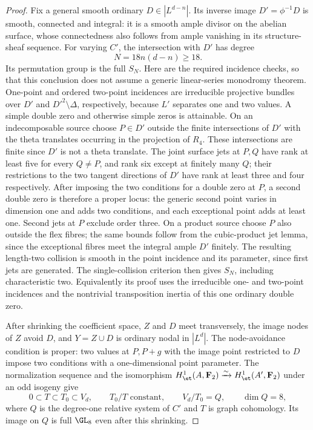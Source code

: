 \begin{proof}
Fix a general smooth ordinary $D\in|L^{d-n}|$.
Its inverse image $D'=\phi^{-1}D$ is smooth, connected and integral:
it is a smooth ample divisor on the abelian surface, whose connectedness
also follows from ample vanishing in its structure-sheaf sequence.
For varying $C'$, the intersection with $D'$ has degree
\[
                         N=18n(d-n)\ge18.
\]
Its permutation group is the full $S_N$. Here are the required incidence
checks, so that this conclusion does not assume a generic linear-series
monodromy theorem. One-point and ordered two-point incidences are
irreducible projective bundles over $D'$ and $D'^2\setminus\Delta$,
respectively, because $L'$ separates one and two values.
A simple double zero and otherwise simple zeros is attainable. On an
indecomposable source choose $P\in D'$ outside the finite intersections
of $D'$ with the theta translates occurring in the projection of $R_4$.
These intersections are finite since $D'$ is not a theta translate.
The joint surface jets at $P,Q$ have rank at least five for every
$Q\ne P$, and rank six except at finitely many $Q$; their restrictions
to the two tangent directions of $D'$ have rank at least three and
four respectively. After imposing the two conditions for a double zero
at $P$, a second double zero is therefore a proper locus: the generic
second point varies in dimension one and adds two conditions, and each
exceptional point adds at least one. Second jets at $P$ exclude order
three. On a product source choose $P$ also outside the flex fibres;
the same bounds follow from the cubic-product jet lemma, since the
exceptional fibres meet the integral ample $D'$ finitely.
The resulting length-two collision is smooth in the point incidence
and its parameter, since first jets are generated.
The single-collision criterion
\cite[Proposition~3.1, pp.~7--8 of the opened version]{Entin2021}
then gives $S_N$, including characteristic two. Equivalently its proof
uses the irreducible one- and two-point incidences and the nontrivial
transposition inertia of this one ordinary double zero.

After shrinking the coefficient space, $Z$ and $D$ meet transversely,
the image nodes of $Z$ avoid $D$, and $Y=Z\cup D$ is ordinary nodal in
$|L^d|$. The node-avoidance condition is proper: two values at $P,P+g$
with the image point restricted to $D$ impose two conditions with a
one-dimensional point parameter. The normalization sequence and the
isomorphism $H^1_{\et}(A,\mathbf F_2)\xrightarrow{\sim}
H^1_{\et}(A',\mathbf F_2)$ under an odd isogeny give
\[
 0\subset T\subset T_0\subset V_d,\qquad
 T_0/T\text{ constant},\qquad V_d/T_0=Q,
 \qquad\dim Q=8,
\]
where $Q$ is the degree-one relative system of $C'$ and $T$ is graph
cohomology. Its image on $Q$ is full $\GL_8$ even after this shrinking.


\end{proof}
